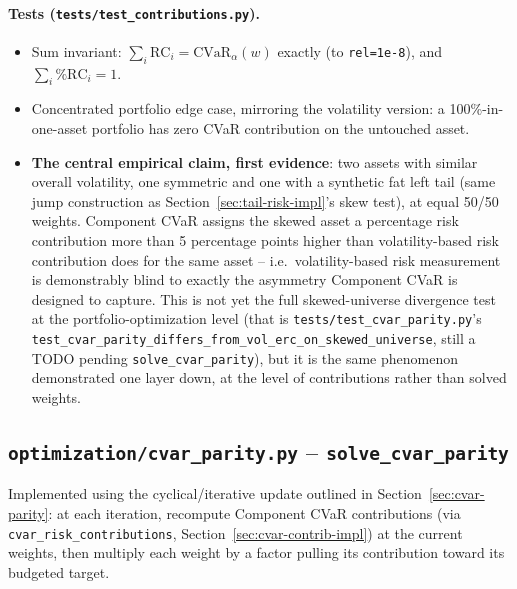 \documentclass[11pt]{article}
\newcommand{\CVar}{\mathrm{CVaR}}
\begin{document}
\paragraph{Tests (\texttt{tests/test\_contributions.py}).}
\begin{itemize}
    \item Sum invariant: $\sum_i \text{RC}_i = \CVar_\alpha(w)$ exactly
    (to \texttt{rel=1e-8}), and $\sum_i \%\text{RC}_i = 1$.
    \item Concentrated portfolio edge case, mirroring the volatility
    version: a 100\%-in-one-asset portfolio has zero CVaR contribution
    on the untouched asset.
    \item \textbf{The central empirical claim, first evidence}: two
    assets with similar overall volatility, one symmetric and one with
    a synthetic fat left tail (same jump construction as
    Section~\ref{sec:tail-risk-impl}'s skew test), at equal 50/50
    weights. Component CVaR assigns the skewed asset a percentage risk
    contribution more than 5 percentage points higher than
    volatility-based risk contribution does for the same asset --
    i.e.\ volatility-based risk measurement is demonstrably blind to
    exactly the asymmetry Component CVaR is designed to capture. This
    is not yet the full skewed-universe divergence test at the
    portfolio-optimization level (that is
    \texttt{tests/test\_cvar\_parity.py}'s
    \texttt{test\_cvar\_parity\_differs\_from\_vol\_erc\_on\_skewed\_universe},
    still a TODO pending \texttt{solve\_cvar\_parity}), but it is the
    same phenomenon demonstrated one layer down, at the level of
    contributions rather than solved weights.
\end{itemize}

\subsection{\texttt{optimization/cvar\_parity.py} -- \texttt{solve\_cvar\_parity}}
\label{sec:cvar-parity-impl}

Implemented using the cyclical/iterative update outlined in
Section~\ref{sec:cvar-parity}: at each iteration, recompute Component
CVaR contributions (via \texttt{cvar\_risk\_contributions},
Section~\ref{sec:cvar-contrib-impl}) at the current weights, then
multiply each weight by a factor pulling its contribution toward its
budgeted target.
\end{document}
